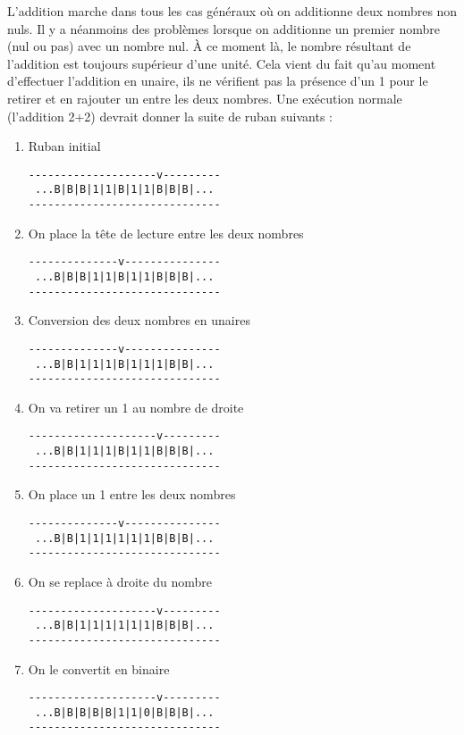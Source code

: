 \documentclass[a4paper,11pt]{article}
\begin{document}
L'addition marche dans tous les cas généraux où on additionne deux nombres non nuls. Il y a néanmoins des problèmes lorsque on additionne un premier nombre (nul ou pas) avec un nombre nul. À ce moment là, le nombre résultant de l'addition est toujours supérieur d'une unité. Cela vient du fait qu'au moment d'effectuer l'addition en unaire, ils ne vérifient pas la présence d'un 1 pour le retirer et en rajouter un entre les deux nombres.
Une exécution normale (l'addition 2+2) devrait donner la suite de ruban suivants :
\begin{enumerate}
\item Ruban initial
\begin{verbatim}
--------------------v---------
 ...B|B|B|1|1|B|1|1|B|B|B|...
------------------------------
\end{verbatim}
\item On place la tête de lecture entre les deux nombres
\begin{verbatim}
--------------v---------------
 ...B|B|B|1|1|B|1|1|B|B|B|...
------------------------------
\end{verbatim}
\item Conversion des deux nombres en unaires
\begin{verbatim}
--------------v---------------
 ...B|B|1|1|1|B|1|1|1|B|B|...
------------------------------
\end{verbatim}
\item On va retirer un 1 au nombre de droite
\begin{verbatim}
--------------------v---------
 ...B|B|1|1|1|B|1|1|B|B|B|...
------------------------------
\end{verbatim}
\item On place un 1 entre les deux nombres
\begin{verbatim}
--------------v---------------
 ...B|B|1|1|1|1|1|1|B|B|B|...
------------------------------
\end{verbatim}
\item On se replace à droite du nombre
\begin{verbatim}
--------------------v---------
 ...B|B|1|1|1|1|1|1|B|B|B|...
------------------------------
\end{verbatim}
\item On le convertit en binaire
\begin{verbatim}
--------------------v---------
 ...B|B|B|B|B|1|1|0|B|B|B|...
------------------------------
\end{verbatim}
\end{enumerate}
\end{document}
